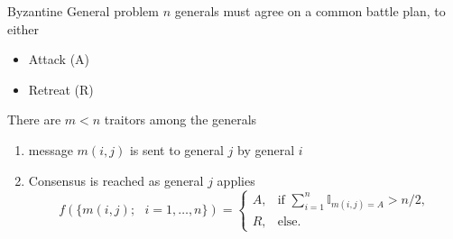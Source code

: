 \documentclass{beamer}
\begin{document}
\begin{frame}{Byzantine General problem}
    $n$ generals must agree on a common battle plan, to either 
    \begin{itemize}
    \item Attack (A) 
    \item Retreat (R)
  \end{itemize}
\begin{tcolorbox}[enhanced,drop shadow, title=Problem]
There are $m<n$ traitors among the generals
\end{tcolorbox}
\begin{enumerate}
\item message $m(i,j)$ is sent to general $j$ by general $i$ 
\item Consensus is reached as general $j$ applies 
$$
f(\{m(i,j);\text{ }i = 1,\ldots,n\}) = \begin{cases}
A,& \text{if }\sum_{i = 1}^n\mathbb{I}_{m(i,j) =A} >n/2,\\
R, &\text{else}.
\end{cases}
$$
\end{enumerate}
\end{frame}
\end{document}

